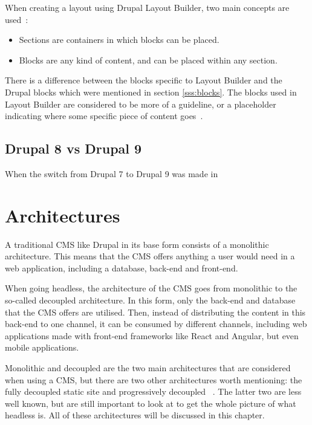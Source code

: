 When creating a layout using Drupal Layout Builder, two main concepts are used~\autocite{Drupalize2022}: 
\begin{itemize}
	\item  Sections are containers in which blocks can be placed.
	\item  Blocks are any kind of content, and can be placed within any section.
\end{itemize}
There is a difference between the blocks specific to Layout Builder and the Drupal blocks which were mentioned in section \ref{sss:blocks}. The blocks used in Layout Builder are considered to be more of a guideline, or a placeholder indicating where some specific piece of content goes~\autocite{Drupalize2022}.


\subsection{Drupal 8 vs Drupal 9}

When the switch from Drupal 7 to Drupal 9 was made in 


\section{Architectures}
A traditional CMS like Drupal in its base form consists of a monolithic architecture. This means that the CMS offers anything a user would need in a web application, including a database, back-end and front-end.

When going headless, the architecture of the CMS goes from monolithic to the so-called decoupled architecture. In this form, only the back-end and database that the CMS offers are utilised. Then, instead of distributing the content in this back-end to one channel, it can be consumed by different channels, including web applications made with front-end frameworks like React and Angular, but even mobile applications.

Monolithic and decoupled are the two main architectures that are considered when using a CMS, but there are two other architectures worth mentioning: the fully decoupled static site and progressively decoupled ~\autocite{Dropsolid2021}. The latter two are less well known, but are still important to look at to get the whole picture of what headless is. All of these architectures will be discussed in this chapter.


